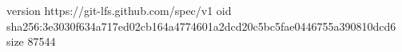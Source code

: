 version https://git-lfs.github.com/spec/v1
oid sha256:3e3030f634a717ed02cb164a4774601a2dcd20c5bc5fae0446755a390810dcd6
size 87544
